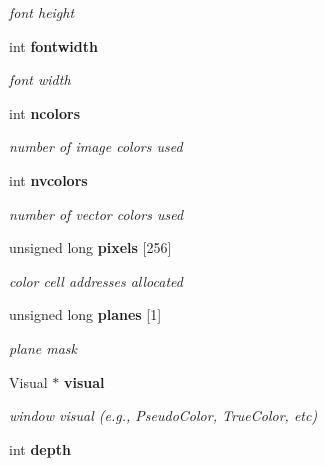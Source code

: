 \begin{CompactItemize}
\begin{CompactList}\small\item\em font height \item\end{CompactList}\item 
int {\bf fontwidth}\label{xtvutils_8c_a30}

\begin{CompactList}\small\item\em font width \item\end{CompactList}\item 
int {\bf ncolors}\label{xtvutils_8c_a31}

\begin{CompactList}\small\item\em number of image colors used \item\end{CompactList}\item 
int {\bf nvcolors}\label{xtvutils_8c_a32}

\begin{CompactList}\small\item\em number of vector colors used \item\end{CompactList}\item 
unsigned long {\bf pixels} [256]\label{xtvutils_8c_a33}

\begin{CompactList}\small\item\em color cell addresses allocated \item\end{CompactList}\item 
unsigned long {\bf planes} [1]\label{xtvutils_8c_a34}

\begin{CompactList}\small\item\em plane mask \item\end{CompactList}\item 
Visual $\ast$ {\bf visual}\label{xtvutils_8c_a35}

\begin{CompactList}\small\item\em window visual (e.g., Pseudo\-Color, True\-Color, etc) \item\end{CompactList}\item 
int {\bf depth}\label{xtvutils_8c_a36}


\end{CompactItemize}
